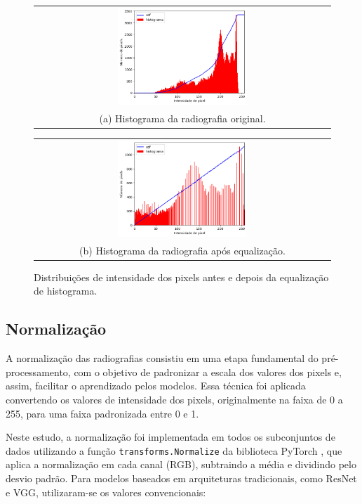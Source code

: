 \begin{figure}
    \centering
    \begin{tabular}{@{}c@{}}
        \includegraphics[width=0.45\textwidth]{figs/histograma-imagem-nao-equalizada.png} \\[\abovecaptionskip]
        \small (a) Histograma da radiografia original.
    \end{tabular}
    \hfill
    \begin{tabular}{@{}c@{}}
        \includegraphics[width=0.45\textwidth]{figs/histograma-imagem-equalizada.png} \\[\abovecaptionskip]
        \small (b) Histograma da radiografia após equalização.
    \end{tabular}
    \caption{Distribuições de intensidade dos pixels antes e depois da equalização de histograma.}
    \label{fig:histogram-equalization-histogram}
\end{figure}

\subsection{Normalização}

A normalização das radiografias consistiu em uma etapa fundamental do pré-processamento, com o objetivo de padronizar a escala dos valores dos pixels e, assim, facilitar o aprendizado pelos modelos. Essa técnica foi aplicada convertendo os valores de intensidade dos pixels, originalmente na faixa de 0 a 255, para uma faixa padronizada entre 0 e 1.

Neste estudo, a normalização foi implementada em todos os subconjuntos de dados utilizando a função \texttt{transforms.Normalize} da biblioteca PyTorch \citep{pytorch}, que aplica a normalização em cada canal (RGB), subtraindo a média e dividindo pelo desvio padrão. Para modelos baseados em arquiteturas tradicionais, como ResNet e VGG, utilizaram-se os valores convencionais:

